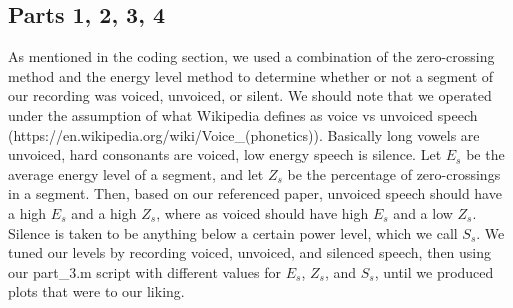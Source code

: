 \documentclass[11pt]{article}
\begin{document}
\subsection{Parts 1, 2, 3, 4}
As mentioned in the coding section, we used a combination of the zero-crossing method and the energy level method to determine whether or not a segment of our recording was voiced, unvoiced, or silent. 
We should note that we operated under the assumption of what Wikipedia defines as voice vs unvoiced speech (https://en.wikipedia.org/wiki/Voice\_(phonetics)). 
Basically long vowels are unvoiced, hard consonants are voiced, low energy speech is silence. 
Let $E_s$ be the average energy level of a segment, and let $Z_s$ be the percentage of zero-crossings in a segment. 
Then, based on our referenced paper, unvoiced speech should have a high $E_s$ and a high $Z_s$, where as voiced should have high $E_s$ and a low $Z_s$. Silence is taken to be anything below a certain power level, which we call $S_s$. We tuned our levels by recording voiced, unvoiced, and silenced speech, then using our part\_3.m script with different values for $E_s$, $Z_s$, and $S_s$, until we produced plots that were to our liking.
\end{document}
